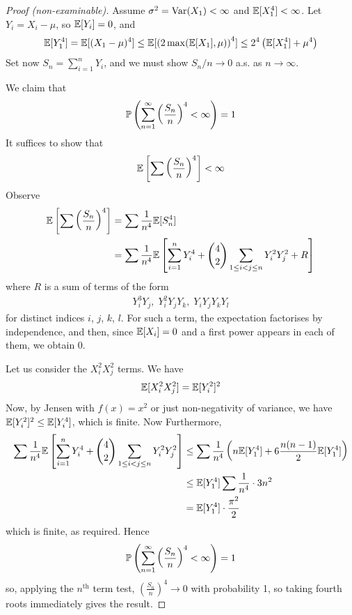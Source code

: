 \documentclass{../../template/note}
\begin{document}
    \begin{proof}[Proof (non-examinable)]
        Assume \(\sigma^2 = \operatorname{Var}(X_1) < \infty\) and \(\mathbb E[X_1^4] < \infty\). Let \(Y_i = X_i - \mu\), so \(\mathbb E[Y_i] = 0\), and 
        \begin{align*}
            \mathbb E[Y_1^4] = \mathbb E[(X_1-\mu)^4] \leq \mathbb E[\left(2\max(\mathbb E[X_1], \mu)\right)^4] \leq 2^4 \left(\mathbb E[X_1^4]+\mu^4\right)
        \end{align*}
        Set now \(S_n = \sum_{i=1}^n Y_i\), and we must show \(S_n/n \to 0\) a.s. as \(n \to \infty\).

        We claim that
        \begin{align*}
            \mathbb P\left(\sum_{n=1}^\infty \left(\frac{S_n}n\right)^4 < \infty\right) = 1
        \end{align*}
        It suffices to show that
        \begin{align*}
            \mathbb E\left[\sum \left(\frac{S_n}n\right)^4\right] < \infty
        \end{align*}
        Observe
        \begin{align*}
            \mathbb E\left[\sum \left(\frac{S_n}n\right)^4\right] &= \sum \frac{1}{n^4} \mathbb E[S_n^4] \\
            &= \sum \frac{1}{n^4} \mathbb E\left[\sum_{i=1}^n Y_i^4 + \binom 4 2 \sum_{1\leq i < j \leq n} Y_i^2 Y_j^2 + R\right]
        \end{align*}
        where \(R\) is a sum of terms of the form
        \begin{align*}
            Y_i^3Y_j, \; Y_i^2Y_jY_k, \; Y_iY_jY_kY_l
        \end{align*}
        for distinct indices \(i\), \(j\), \(k\), \(l\). For such a term, the expectation factorises by independence, and then, since \(\mathbb E[X_i] = 0\) and a first power appears in each of them, we obtain 0.

        Let us consider the \(X_i^2X_j^2\) terms. We have
        \begin{align*}
            \mathbb E[X_i^2X_j^2] = \mathbb E[Y_i^2]^2
        \end{align*}
        Now, by Jensen with \(f(x) = x^2\) or just non-negativity of variance, we have \(\mathbb E[Y_i^2]^2 \leq \mathbb E[Y_i^4]\), which is finite. Now
        Furthermore,
        \begin{align*}
            \sum \frac 1{n^4} \mathbb E\left[\sum_{i=1}^n Y_i^4 + \binom 4 2 \sum_{1 \leq i < j \leq n}Y_i^2Y_j^2\right] &\leq \sum \frac 1{n^4} \left(n \mathbb E[Y_1^4] + 6\frac{n(n-1)}{2} \mathbb E[Y_1^4]\right) \\
            &\leq \mathbb E[Y_1^4] \sum \frac{1}{n^4} \cdot 3n^2 \\
            &= \mathbb E[Y_1^4] \cdot \frac{\pi^2}{2} 
        \end{align*}
        which is finite, as required. Hence 
        \begin{align*}
            \mathbb P\left(\sum_{n=1}^\infty \left(\frac{S_n}n\right)^4 < \infty\right) = 1
        \end{align*}
        so, applying the \(n^\text{th}\) term test, \(\left(\frac{S_n}{n}\right)^4 \to 0\) with probability 1, so taking fourth roots immediately gives the result.
    \end{proof}
    
\end{document}
